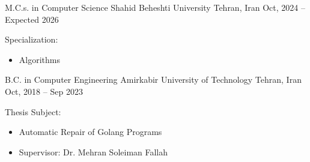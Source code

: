 

\begin{cventries}

  \cventry 
  {M.C.s. in Computer Science} %
  {Shahid Beheshti University} %
  {Tehran, Iran} %
  {Oct, 2024 – Expected 2026} %
  {
      \begin{cvitems}
      \item {Specialization:}
      \begin{itemize}
      \item {Algorithms}
      \end{itemize}
      \end{cvitems}
  }
  \vspace{0.5cm}

  \cventry 
    {B.C. in Computer Engineering} %
    {Amirkabir University of Technology} %
    {Tehran, Iran} %
    {Oct, 2018 – Sep 2023} %
    {
        \begin{cvitems}
        \item {Thesis Subject:}
        \begin{itemize}
        \item {Automatic Repair of Golang Programs}
        \item {Supervisor: Dr. Mehran Soleiman Fallah}
        \end{itemize}
        \end{cvitems}
    }

\end{cventries}

